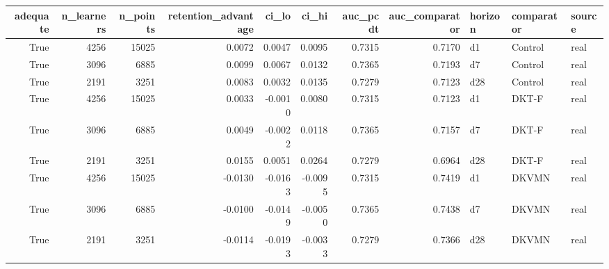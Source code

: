 \begin{tabular}{rrrrrrrrlll}
\toprule
adequate & n\_learners & n\_points & retention\_advantage & ci\_lo & ci\_hi & auc\_pcdt & auc\_comparator & horizon & comparator & source \\
\midrule
True & 4256 & 15025 & 0.0072 & 0.0047 & 0.0095 & 0.7315 & 0.7170 & d1 & Control & real \\
True & 3096 & 6885 & 0.0099 & 0.0067 & 0.0132 & 0.7365 & 0.7193 & d7 & Control & real \\
True & 2191 & 3251 & 0.0083 & 0.0032 & 0.0135 & 0.7279 & 0.7123 & d28 & Control & real \\
True & 4256 & 15025 & 0.0033 & -0.0010 & 0.0080 & 0.7315 & 0.7123 & d1 & DKT-F & real \\
True & 3096 & 6885 & 0.0049 & -0.0022 & 0.0118 & 0.7365 & 0.7157 & d7 & DKT-F & real \\
True & 2191 & 3251 & 0.0155 & 0.0051 & 0.0264 & 0.7279 & 0.6964 & d28 & DKT-F & real \\
True & 4256 & 15025 & -0.0130 & -0.0163 & -0.0095 & 0.7315 & 0.7419 & d1 & DKVMN & real \\
True & 3096 & 6885 & -0.0100 & -0.0149 & -0.0050 & 0.7365 & 0.7438 & d7 & DKVMN & real \\
True & 2191 & 3251 & -0.0114 & -0.0193 & -0.0033 & 0.7279 & 0.7366 & d28 & DKVMN & real \\
\bottomrule
\end{tabular}
